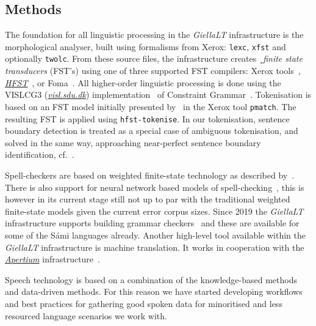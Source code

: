 \documentclass[free]{flammie}
\begin{document}
\subsection{Methods}

The foundation for all linguistic processing in the \textit{GiellaLT}
infrastructure is the morphological analyser, built using formalisms from Xerox:
\texttt{lexc}, \texttt{xfst} and optionally \texttt{twolc}. From these source
files, the infrastructure creates ¸\textit{finite state transducers} (FST's)
using one of three supported FST compilers: Xerox
tools~\cite{beesley2003finite},
\textit{\href{https://hfst.github.io}{HFST}}~\cite{linden2013hfst}, or
Foma~\cite{hulden2009foma}.  All higher-order linguistic processing is done
using the VISLCG3 (\textit{\href{http://visl.sdu.dk}{visl.sdu.dk}})
implementation~\cite{didriksen2016constraint} of Constraint
Grammar~\cite{karlsson1990constraint}.  Tokenisation is based on an FST model
initially presented by~\cite{karttunen2011beyond} in the Xerox tool
\texttt{pmatch}. The resulting FST is applied using \texttt{hfst-tokenise}.  In
our tokenisation, sentence boundary detection is treated as a special case of
ambiguous tokenisation, and solved in the same way, approaching near-perfect
sentence boundary identification, cf.\ \cite{wiechetek-etal-2019-seeing}.

Spell-checkers are based on weighted finite-state technology as described
by~\cite{pirinen2014state}.  There is also support for neural network based
models of spell-checking~\cite{kaalep2022you}, this is however in its current
stage still not up to par with the traditional weighted finite-state models
given the current error corpus sizes.  Since 2019 the \textit{GiellaLT}
infrastructure supports building grammar checkers~\cite{Wiechetek2019many} and
these are available for some of the Sámi languages already.  Another high-level
tool available within the \textit{GiellaLT} infrastructure is machine
translation. It works in cooperation with the
\textit{\href{https://github.com/apertium}{Apertium}}
infrastructure~\cite{khanna2021apertium}.

Speech technology is based on a combination of the knowledge-based methods and
data-driven methods.  For this reason we have started developing workflows and
best practices for gathering good spoken data for minoritised and less resourced
language scenarios we work with.
\end{document}
